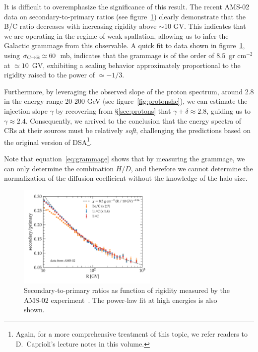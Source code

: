 It is difficult to overemphasize the significance of this result. 
%
The recent AMS-02 data on secondary-to-primary ratios (see figure~\ref{fig:bcams02}) clearly demonstrate that the B/C ratio decreases with increasing rigidity above $\sim$10 GV. %
%
This indicates that we are operating in the regime of weak spallation, allowing us to infer the Galactic grammage from this observable.
%
A quick fit to data shown in figure~\ref{fig:bcams02}, using $\sigma_{\rm C \rightarrow B} \simeq 60$~mb, indicates that the grammage is of the order of $8.5$~gr cm$^{-2}$ at $\simeq 10$~GV, exhibiting a scaling behavior approximately proportional to the rigidity raised to the power of $\simeq -1/3$. 

Furthermore, by leveraging the observed slope of the proton spectrum, around 2.8 in the energy range 20-200 GeV (see figure~\ref{fig:protonshe}), we can estimate the injection slope $\gamma$ by recovering from \S\ref{sec:protons} that $\gamma + \delta \approx 2.8$, guiding us to $\gamma \approx 2.4$. 
%
Consequently, we arrived to the conclusion that the energy spectra of CRs at their sources must be relatively \emph{soft}, challenging the predictions based on the original version of DSA\footnote{Again, for a more comprehensive treatment of this topic, we refer readers to D.~Caprioli's lecture notes in this volume.}.

Note that equation~\eqref{eq:grammage} shows that by measuring the grammage, we can only determine the combination $H/D$, and therefore we cannot determine the normalization of the diffusion coefficient without the knowledge of the halo size.

\begin{figure}
\centering
\includegraphics[width=0.6\textwidth]{figures/LiBeB_C_AMS02.pdf}
\caption{Secondary-to-primary ratios as function of rigidity measured by the AMS-02 experiment~\cite{AMS02libeb}. The power-law fit at high energies is also shown.}
\label{fig:bcams02}
\end{figure}


